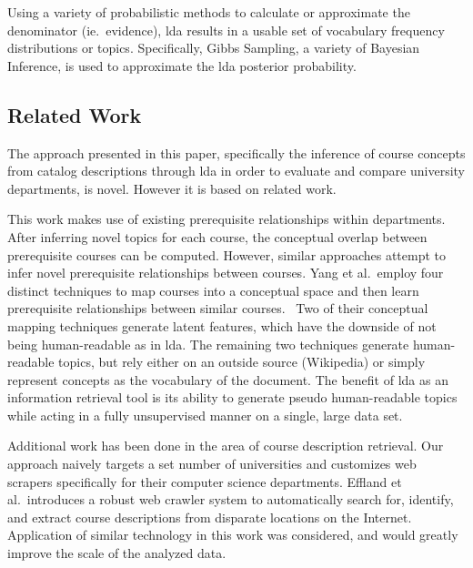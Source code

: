 
\noindent
Using a variety of probabilistic methods to calculate or approximate the denominator (ie.\ evidence), \ac{lda} results in a usable set of vocabulary frequency distributions or topics.
Specifically, Gibbs Sampling, a variety of Bayesian Inference, is used to approximate the \ac{lda} posterior probability.~\cite{Blei2003}


\subsection{Related Work}
\label{sec:related-work}


The approach presented in this paper, specifically the inference of course concepts from catalog descriptions through \ac{lda} in order to evaluate and compare university departments, is novel.
However it is based on related work.


This work makes use of existing prerequisite relationships within departments.
After inferring novel topics for each course, the conceptual overlap between prerequisite courses can be computed.
However, similar approaches attempt to infer novel prerequisite relationships between courses.
Yang et al.\ employ four distinct techniques to map courses into a conceptual space and then learn prerequisite relationships between similar courses.~\cite{Yang2015}
Two of their conceptual mapping techniques generate latent features, which have the downside of not being human-readable as in \ac{lda}.
The remaining two techniques generate human-readable topics, but rely either on an outside source (Wikipedia) or simply represent concepts as the vocabulary of the document.
The benefit of \ac{lda} as an information retrieval tool is its ability to generate pseudo human-readable topics while acting in a fully unsupervised manner on a single, large data set.


Additional work has been done in the area of course description retrieval.
Our approach naively targets a set number of universities and customizes web scrapers specifically for their computer science departments.
Effland et al.\ introduces a robust web crawler system to automatically search for, identify, and extract course descriptions from disparate locations on the Internet.~\cite{Effland2015}
Application of similar technology in this work was considered, and would greatly improve the scale of the analyzed data.



